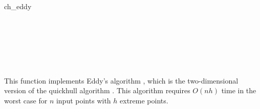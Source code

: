 \begin{ccRefFunction}{ch_eddy}
\ccSeeAlso

 \\
 \\
 \\
 \\
 \\

\ccImplementation

This function implements Eddy's algorithm 
\cite{e-nchap-77}, which  is the two-dimensional version of the quickhull
algorithm \cite{bdh-qach-96}%
. 
This algorithm requires $O(n h)$ time 
in the worst case for $n$ input points with $h$ extreme points.  

\end{ccRefFunction}


